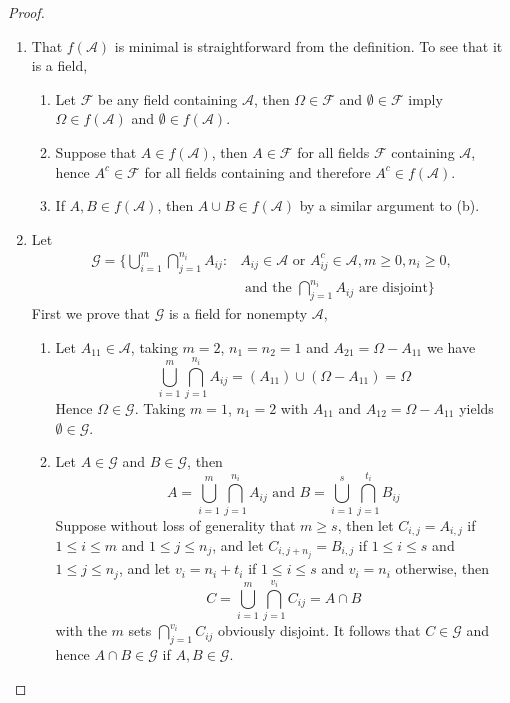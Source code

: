 \documentclass[11pt]{article}
\newcommand{\F}{\mathcal{F}}
\newcommand{\A}{\mathcal{A}}
\newcommand{\G}{\mathcal{G}}
\newcommand{\Om}{\Omega}
\newcommand{\es}{\emptyset}
\newcommand{\un}{\cup}
\newcommand{\ic}{\cap}
\begin{document}
\begin{proof}
    \begin{enumerate}
        \item That $f(\A)$ is minimal is straightforward from the definition. To see that it is a field,
        \begin{enumerate}
            \item Let $\F$ be any field containing $\A$, then $\Om \in \F$ and $\es \in \F$ imply $\Om \in f(\A)$ and $\es \in f(\A)$.
            \item Suppose that $A \in f(\A)$, then $A \in \F$ for all fields $\F$ containing $\A$, hence $A^{c} \in \F$ for all fields containing and therefore $A^{c} \in f(\A)$.
            \item If $A, B \in f(\A)$, then $A \un B \in f(\A)$ by a similar argument to (b).
        \end{enumerate}
        \item Let 
        \begin{align*}
            \G = \Big \{ \bigcup_{i=1}^{m} \bigcap_{j=1}^{n_i} A_{ij} : & A_{ij} \in \A \text { or } A_{ij}^{c} \in \A, m \geq 0, n_i \geq 0, \\
            & \text { and the }  \bigcap_{j=1}^{n_i} A_{ij} \text { are disjoint} \Big \}
        \end{align*}
        First we prove that $\G$ is a field for nonempty $\A$,
        \begin{enumerate}
            \item Let $A_{11} \in \A$, taking $m=2$, $n_1 = n_2 = 1$ and $A_{21} = \Om - A_{11}$ we have
            \[ \bigcup_{i=1}^{m} \bigcap_{j=1}^{n_i} A_{ij} = (A_{11}) \un (\Om - A_{11}) = \Om \]
            Hence $\Om \in \G$. Taking $m=1$, $n_1 = 2$ with $A_{11}$ and $A_{12} = \Om - A_{11}$ yields $\es \in \G$.
            \item Let $A \in \G$ and $B \in \G$, then
            \[ A = \bigcup_{i=1}^{m} \bigcap_{j=1}^{n_i} A_{ij} \text { and } B = \bigcup_{i=1}^{s} \bigcap_{j=1}^{t_i} B_{ij} \]
            Suppose without loss of generality that $m \geq s$, then let $C_{i,j} = A_{i,j}$ if $1 \leq i \leq m$ and $1 \leq j \leq n_j$, and let $C_{i, j+n_j} = B_{i, j}$ if $1 \leq i \leq s$ and $1 \leq j \leq n_j$, and let $v_i = n_i + t_i$ if $1 \leq i \leq s$ and $v_i = n_i$ otherwise, then 
            \[ C = \bigcup_{i=1}^{m} \bigcap_{j=1}^{v_i} C_{ij} = A \ic B \]
            with the $m$ sets $\bigcap_{j=1}^{v_i} C_{ij}$ obviously disjoint. It follows that $C \in \G$ and hence $A \ic B \in \G$ if $A, B \in \G$.

\end{enumerate}
\end{enumerate}
\end{proof}
\end{document}
